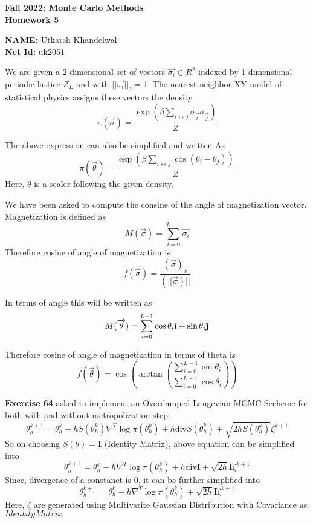 \documentclass[11pt]{article}
\newcommand{\uvec}[1]{\boldsymbol{\hat{\textbf{#1}}}}
\begin{document}
\begin{center}
\large \textbf{%
Fall 2022: Monte Carlo Methods}\\
\textbf{ Homework 5 }
\end{center}
\begin{center}
{\textbf{NAME:} Utkarsh Khandelwal\\}
{\textbf{Net Id:} uk2051}
\end{center}


\noindent We are given a 2-dimensional set of vectors $\overrightarrow{\sigma_{i}} \in R^2$ indexed by 1 dimensional periodic lattice $Z_L$
and with $||\overrightarrow{\sigma_i}||_2 = 1$. The nearest neighbor XY model of statistical physics assigns these vectors the density
$$\pi(\overrightarrow{\sigma}) = \frac{ \exp{\left( \beta \sum_{{i \leftrightarrow j}} \sigma_{\overrightarrow{i}} \sigma_{\overrightarrow{j}}\right)} }     {Z}$$

The above expression can also be simplified and written As
$$\pi(\overrightarrow{\theta}) = \frac{ \exp{\left( \beta \sum_{i \leftrightarrow j} \cos(\theta_i - \theta_j) \right)} }     {Z}$$
Here, $\theta$ is a scaler following the given density.

We have been asked to compute the consine of the angle of magnetization vector. Magnetization is defined as
$$M(\overrightarrow{\sigma}) = \sum_{i = 0}^{L - 1} \overrightarrow{\sigma_i}$$
Therefore cosine of angle of magnetization is
$$f(\overrightarrow{\sigma}) = \frac{(\overrightarrow{\sigma})_x }{(||\overrightarrow{\sigma})||}$$

In terms of angle this will be written as
$$M(\overrightarrow{\theta}) = \sum_{i = 0}^{L - 1} \cos{\theta_i} \uvec{\i} + \sin{\theta_i} \uvec{\j}$$

Therefore cosine of angle of magnetization in terms of theta is
$$f(\overrightarrow{\theta}) = \cos \left(
							\arctan \left( 
								\frac{ \sum_{i = 0}^{L - 1} \sin{\theta_i}} {\sum_{i = 0}^{L - 1} \cos{\theta_i}} 
								\right) \right)$$

\noindent \textbf{Exercise 64} asked to implement an Overdamped Langevian MCMC Secheme for both with and without metropolization step.
$$
\theta_h^{k + 1} = \theta_h^{k} + h S(\theta_h^{k}) \nabla^T \log \pi(\theta_h^{k}) + h \text{div} S(\theta_h^{k}) + \sqrt{2 h S(\theta_h^{k})} \zeta^{k + 1}
$$
So on choosing $S(\theta) = \textbf{I}$ (Identity Matrix), above equation can be simplified into
$$
\theta_h^{k + 1} = \theta_h^{k} + h \nabla^T \log \pi(\theta_h^{k}) + h \text{div} \textbf{I} + \sqrt{2 h} \textbf{I} \zeta^{k + 1}
$$
Since, divergence of a constanct is $0$, it can be further simplified into
$$
\theta_h^{k + 1} = \theta_h^{k} + h \nabla^T \log \pi(\theta_h^{k}) + \sqrt{2 h} \textbf{I} \zeta^{k + 1}
$$
Here, $\zeta$ are generated using Multivarite Gaussian Distribution with Covariance as $Identity Matrix$
\end{document}
